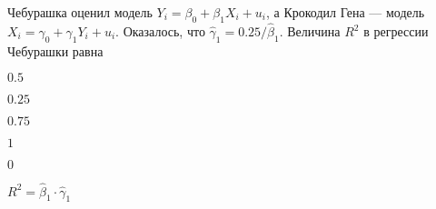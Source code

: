 
\begin{question}
Чебурашка оценил модель \(Y_i = \beta_0 + \beta_1 X_i + u_i\), а Крокодил Гена --- модель \(X_i = \gamma_0 + \gamma_1 Y_i + u_i\).
Оказалось, что \(\hat\gamma_1 = 0.25/\hat\beta_1\). Величина \(R^2\) в регрессии Чебурашки равна
\begin{answerlist}
  \item \(0.5\)
  \item \(0.25\)
  \item \(0.75\)
  \item \(1\)
  \item \(0\)
\end{answerlist}
\end{question}

\begin{solution}
\(R^2 = \hat\beta_1 \cdot \hat\gamma_1\)
\end{solution}

